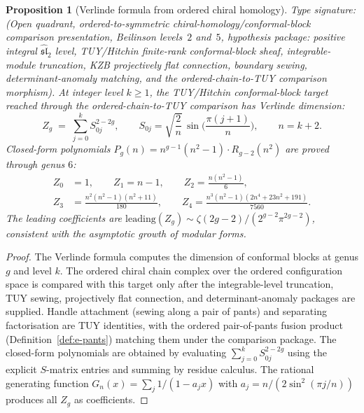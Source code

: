 \documentclass[11pt,reqno]{amsart}
\newtheorem{proposition}[theorem]{Proposition}
\theoremstyle{definition}
\theoremstyle{remark}
\begin{document}
\begin{proposition}[Verlinde formula from ordered chiral homology]
\label{prop:e-verlinde}
\ClaimStatusConditional
Type signature: \textup{(}Open quadrant, ordered-to-symmetric
chiral-homology/conformal-block comparison presentation, Beilinson
levels~$2$ and~$5$, hypothesis package: positive integral
\(\widehat{\mathfrak{sl}}_2\) level, TUY/Hitchin finite-rank
conformal-block sheaf, integrable-module truncation, KZB
projectively flat connection, boundary sewing, determinant-anomaly
matching, and the ordered-chain-to-TUY comparison morphism\textup{)}.
At integer level $k \ge 1$, the TUY/Hitchin conformal-block target
reached through the ordered-chain-to-TUY comparison has Verlinde
dimension:
\begin{equation}\label{eq:e-verlinde}
Z_g
\;=\;
\sum_{j=0}^{k} S_{0j}^{2-2g},
\qquad
S_{0j}
= \sqrt{\frac{2}{n}}\,\sin\!\biggl(\frac{\pi(j+1)}{n}\biggr),
\qquad n = k + 2.
\end{equation}
Closed-form polynomials
$P_g(n) = n^{g-1}(n^2 - 1) \cdot R_{g-2}(n^2)$
are proved through genus $6$:
\begin{align}
Z_0 &= 1,\qquad Z_1 = n - 1,\qquad
Z_2 = \frac{n(n^2-1)}{6},\label{eq:e-verlinde-low}\\
Z_3 &= \frac{n^2(n^2-1)(n^2+11)}{180},\qquad
Z_4 = \frac{n^3(n^2-1)(2n^4+23n^2+191)}{7560}.
\label{eq:e-verlinde-high}
\end{align}
The leading coefficients are
$\mathrm{leading}(Z_g) \sim
\zeta(2g-2)/(2^{g-2}\pi^{2g-2})$, consistent with the
asymptotic growth of modular forms.
\end{proposition}

\begin{proof}
The Verlinde formula computes the dimension of conformal blocks
at genus $g$ and level $k$. The ordered chiral chain complex over
the ordered configuration space is compared with this target only
after the integrable-level truncation, TUY sewing, projectively flat
connection, and determinant-anomaly packages are supplied.
Handle attachment (sewing along a pair of pants) and separating
factorisation are TUY identities, with the ordered pair-of-pants
fusion product (Definition~\ref{def:e-pants}) matching them under the
comparison package. The closed-form polynomials are obtained
by evaluating $\sum_{j=0}^{k} S_{0j}^{2-2g}$ using the
explicit $S$-matrix entries and summing by residue calculus.
The rational generating function
$G_n(x) = \sum_j 1/(1 - a_j x)$ with
$a_j = n/(2\sin^2(\pi j/n))$ produces all $Z_g$ as
coefficients.
\end{proof}
\end{document}
